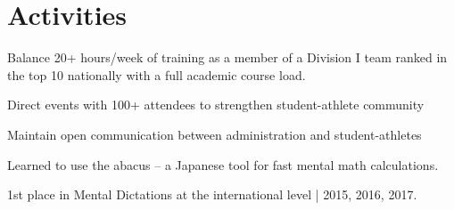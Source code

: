\documentclass[]{deedy-resume-openfont}
\begin{document}
\begin{minipage}[t]{0.66\textwidth}


\section{Activities} 
\begin{tightemize}
    \item Balance 20+ hours/week of training as a member of a Division I team ranked in the top 10 nationally with a full academic course load.
\end{tightemize}
\sectionsep

\begin{tightemize}
    \item Direct events with 100+ attendees to strengthen student-athlete community
    \item Maintain open communication between administration and student-athletes
\end{tightemize}
\sectionsep

\descript{}
\begin{tightemize}
    \item Learned to use the abacus – a Japanese tool for fast mental math calculations. 
    \item 1st place in Mental Dictations at the international level | 2015, 2016, 2017.
\end{tightemize}

\end{minipage} 
\end{document}

